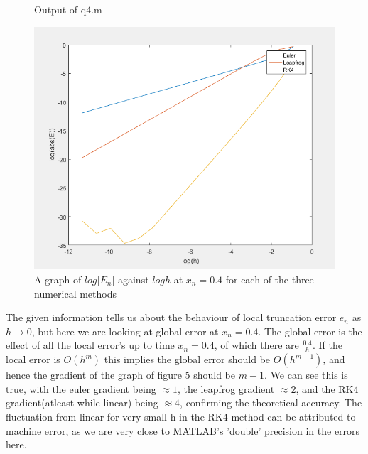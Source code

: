 \documentclass[10pt,a4paper]{report}
\begin{document}
\begin{figure}[ht]
\begin{minipage}[b]{0.4\linewidth}
\begin{table}[H]
\caption{Output of q4.m}

\vspace{0.5cm}

\end{table}

\end{minipage}
\hspace{0.5cm}
\begin{minipage}[b]{0.6\linewidth}
\centering
\includegraphics[width=\textwidth]{q4}
\caption{A graph of $log|E_n|$ against $logh$  at $x_n=0.4$ for each of the three numerical methods}

\end{minipage}
\end{figure}

\newpage

The given information tells us about the behaviour of local truncation error $e_n$ as $h \rightarrow 0$, but here we are looking at global error at $x_n=0.4$. The global error is the effect of all the local error's up to time $x_n=0.4$, of which there are $\frac{0.4}{h}$. If the local error is $O(h^m)$ this implies the global error should be $O(h^{m-1})$, and hence the gradient of the graph of figure 5 should be $m-1$. We can see this is  true, with the euler gradient being $\approx 1$, the leapfrog gradient $\approx 2$, and the RK4 gradient(atleast while linear) being $\approx 4$, confirming the theoretical accuracy. The fluctuation from linear for very small h in the RK4 method can be attributed to machine error, as we are very close to MATLAB's 'double' precision in the errors here.
\end{document}
